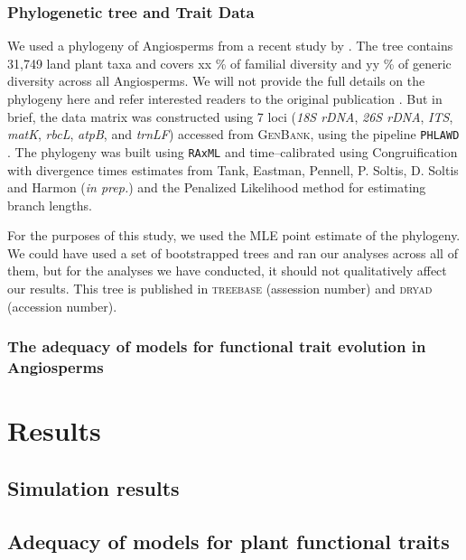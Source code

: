 \documentclass[12pt]{article}
\begin{document}
\subsubsection{Phylogenetic tree and Trait Data}

We used a phylogeny of Angiosperms from a recent study by \citet{ZanneBigTree}. The tree contains 31,749 land plant taxa and covers xx \% of familial diversity and yy \% of generic diversity across all Angiosperms. We will not provide the full details on the phylogeny here and refer interested readers to the original publication \citep{ZanneBigTree}. But in brief, the data matrix was constructed using 7 loci (\textit{18S rDNA}, \textit{26S rDNA}, \textit{ITS}, \textit{matK}, \textit{rbcL}, \textit{atpB}, and \textit{trnLF}) accessed from \textsc{GenBank}, using the pipeline \texttt{PHLAWD} \citep{phlawd}. The phylogeny was built using \texttt{RAxML} \citep{raxml} and time--calibrated using Congruification \citep{Eastmancongruify} with divergence times estimates from Tank, Eastman, Pennell, P. Soltis, D. Soltis and Harmon (\textit{in prep.}) and the Penalized Likelihood method \citep{Sanderson1997, treepl} for estimating branch lengths.

For the purposes of this study, we used the MLE point estimate of the phylogeny. We could have used a set of bootstrapped trees and ran our analyses across all of them, but for the analyses we have conducted, it should not qualitatively affect our results. This tree is published in \textsc{treebase} (assession number) and \textsc{dryad} (accession number).

\subsubsection{The adequacy of models for functional trait evolution in Angiosperms}


\section{Results}

\subsection{Simulation results}

\subsection{Adequacy of models for plant functional traits}
\end{document}
